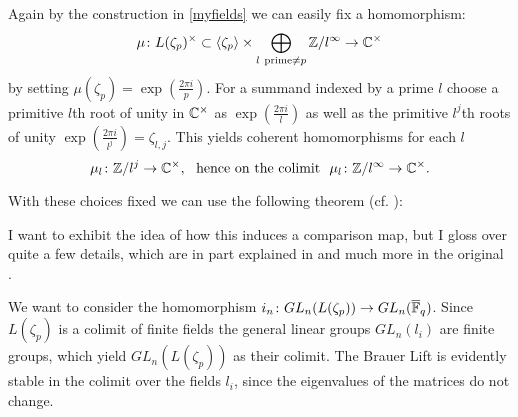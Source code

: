 Again by the construction in \ref{myfields} we can easily fix a
homomorphism:\[\mu\colon L(\zeta_p)^\times \subset \langle\zeta_p
\rangle \times\bigoplus_{l ~\mathrm{prime} \neq p}\mathbb{Z}/l^\infty 
\rightarrow \mathbb{C}^\times\] by setting $\mu(\zeta_p) =
\exp(\frac{2\pi i}{p}).$ For a summand indexed by a prime $l$ choose a 
primitive $l$th root of unity in $\mathbb{C}^\times$ as 
$\exp(\frac{2\pi i}{l})$ as well as the primitive $l^j$th roots of 
unity $\exp(\frac{2\pi i}{l^j})=\zeta_{l,j}$. This yields coherent 
homomorphisms for each $l$ \[\mu_l\colon \mathbb{Z}/l^j\rightarrow \mathbb{C}^\times, 
\mathrm{~~hence~on~the~colimit~~} \mu_l\colon\mathbb{Z}/l^\infty \rightarrow 
\mathbb{C}^\times.\]

With these choices fixed we can use the following theorem (cf.
\cite[p. 283, Theorem 5.3.4]{Ros1994}):
{}

{}

I want to exhibit the idea of how this induces a comparison map, 
but I gloss over quite a few details, which are in part explained 
in \cite[pp. 284--285]{Ros1994} and much more in the original 
\cite{Q1971,Q1972}.

We want to consider the homomorphism $i_n\colon GL_n(L(\zeta_p))
\rightarrow GL_n(\overline{\mathbb{F}}_q)$. Since $L(\zeta_p)$ is a colimit of finite
fields the general linear groups $GL_n(l_i)$ are finite groups, which
yield $GL_n(L(\zeta_p))$ as their colimit. The Brauer Lift is
evidently stable in the colimit over the fields $l_i$, since the 
eigenvalues of the matrices do not change. 

